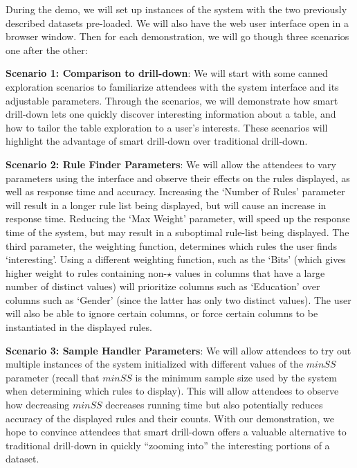 During the demo, we will set up instances of the system with the two previously described datasets pre-loaded. We will also have the web user interface open in a browser window. Then for each demonstration, we will go though three scenarios one after the other:
\squishlist
\item {\bf Scenario 1: Comparison to drill-down}: We will start with some canned exploration scenarios to familiarize attendees with the system interface and its adjustable parameters. Through the scenarios, we will demonstrate how smart drill-down lets one quickly discover interesting information about a table, and how to tailor the table exploration to a user's interests. These scenarios will highlight the advantage of smart drill-down over traditional drill-down. 
\item {\bf Scenario 2: Rule Finder Parameters}: We will allow the attendees to vary parameters using the interface and observe their effects on the rules displayed, as well as response time and accuracy. Increasing the `Number of Rules' parameter will result in a longer rule list being displayed, but will cause an increase in response time. Reducing the `Max Weight' parameter, will speed up the response time of the system, but may result in a suboptimal rule-list being displayed. The third parameter, the weighting function, determines which rules the user finds `interesting'. Using a different weighting function, such as the `Bits' (which gives higher weight to rules containing non-$\star$ values in columns that have a large number of distinct values) will prioritize columns such as `Education' over columns such as `Gender' (since the latter has only two distinct values). The user will also be able to ignore certain columns, or force certain columns to be instantiated in the displayed rules. 
\item {\bf Scenario 3: Sample Handler Parameters}: We will allow attendees to try out multiple instances of the system initialized with different values of the $minSS$  parameter (recall that $minSS$ is the minimum sample size used by the system when determining which rules to display). This will allow attendees to observe how decreasing $minSS$ decreases running time but also potentially reduces accuracy of the displayed rules and their counts.
\squishend
\noindent With our demonstration, we hope to convince attendees that smart drill-down offers
a valuable alternative to traditional drill-down in quickly ``zooming into'' the interesting portions of a dataset.
